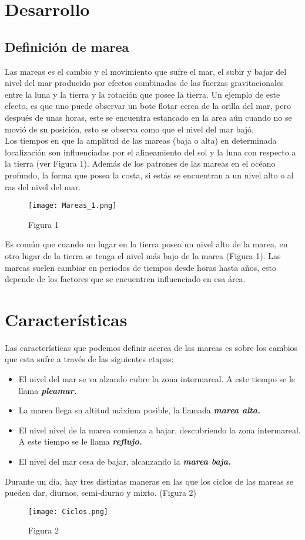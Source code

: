 \documentclass{article}
\begin{document}
\section{\LARGE Desarrollo}
\subsection{\Large Definición de marea}
\large Las mareas es el cambio y el movimiento que sufre el mar, el subir y bajar del nivel del mar producido por efectos combinados de las fuerzas gravitacionales entre la luna y la tierra y la rotación que posee la tierra. Un ejemplo de este efecto, es que uno puede observar un bote flotar cerca de la orilla del mar, pero después de unas horas, este se encuentra estancado en la area aún cuando no se movió de su posición, esto se observa como que el nivel del mar bajó.\\

Los tiempos en que la amplitud de las mareas (baja o alta) en determinada localización son influenciadas por el alineamiento del sol y la luna con respecto a la tierra (ver Figura 1). Además de los patrones de las mareas en el océano profundo, la forma que posea la costa, si estás se encuentran a un nivel alto o al ras del nivel del mar.\\
\begin{figure}[ht!]
\centering
\texttt{[image: Mareas\_1.png]}
\caption{Figura 1}
\end{figure}


Es común que cuando un lugar en la tierra posea un nivel alto de la marea, en otro lugar de la tierra se tenga el nivel más bajo de la marea (Figura 1). Las mareas suelen cambiar en periodos de tiempos desde horas hasta años, esto depende de los factores que se encuentren influenciado en esa área.
\pagebreak
\section{\Large Características}
Las características que podemos definir acerca de las mareas es sobre los cambios que esta sufre a través de las siguientes etapas:
\begin{itemize}
\item El nivel del mar se va alzando cubre la zona intermareal. A este tiempo se le llama \textit{\textbf{pleamar.}}
\item La marea llega su altitud máxima posible, la llamada \textit{\textbf{marea alta.}}
\item El nivel nivel de la marea comienza a bajar, descubriendo la zona intermareal. A este tiempo se le llama \textit{\textbf{reflujo.}} 
\item El nivel del mar cesa de bajar, alcanzando la \textit{\textbf{marea baja.}}
\end{itemize}
Durante un día, hay tres distintas maneras en las que los ciclos de las mareas se pueden dar, diurnos, semi-diurno y mixto. (Figura 2)\\
\begin{figure}[ht!]
\centering
\texttt{[image: Ciclos.png]}
\caption{Figura 2}
\end{figure}
\end{document}

